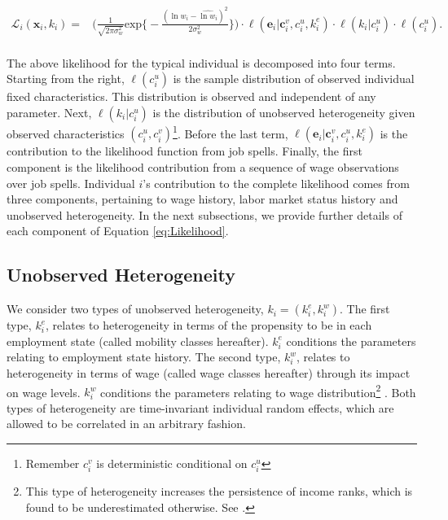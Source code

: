 \documentclass[12pt, a4paper]{article}
\begin{document}

\begin{align}\label{eq:Likelihood}
\mathcal{L}_{i}(\textbf{x}_i,k_i)=& \Bigg( \frac{1}{\sqrt{2\pi \sigma_{w}^{2}}} \text{exp} \Big\{ -\frac{(\ln w_{i} - \widehat{\ln w_{i}})^{2}}{2\sigma_{w}^{2}} \Big\} \Bigg) \cdot \ell(\textbf{e}_i|\textbf{c}_i^v,c_i^u,k_i^e)\cdot \ell(k_i|c_i^u)\cdot \ell (c_i^u).\\ \nonumber
\end{align}


The above likelihood for the typical individual is decomposed into four terms. Starting from the right, $\ell (c_i^u)$ is the sample distribution of observed individual fixed characteristics. This distribution is observed and independent of any parameter. Next, $\ell(k_i|c_i^u)$ is the distribution of unobserved heterogeneity given observed characteristics $(c_i^u,c_i^v)$\footnote{Remember $c_i^v$ is deterministic conditional on $c_i^u$}. Before the last term,  $\ell(\textbf{e}_i|\textbf{c}_{i}^{v},c_{i}^{u},k_{i}^{e})$ is the contribution to the likelihood function from job spells. Finally, the first component is the likelihood contribution from a sequence of wage observations over job spells. Individual $i$'s contribution to the complete likelihood comes from three components, pertaining to wage history, labor market status history and unobserved heterogeneity. In the next subsections, we provide further details of each component of Equation \ref{eq:Likelihood}.

\subsection{Unobserved Heterogeneity}\label{sec:unobs_het}

We consider two types of unobserved heterogeneity, $k_i=(k_i^e,k_i^w)$. The first type, $k_i^e$, relates to heterogeneity in terms of the propensity to be in each employment state (called mobility classes hereafter). $k_i^e$ conditions the parameters relating to employment state history. The second type, $k_i^w$, relates to heterogeneity in terms of wage (called wage classes hereafter) through its impact on wage levels. $k_i^w$ conditions the parameters relating to wage distribution\footnote{This type of heterogeneity increases the persistence of income ranks, which is found to be underestimated otherwise. See \cite{Sh76}.} . Both types of heterogeneity are time-invariant individual random effects, which are allowed to be correlated in an arbitrary fashion.
\end{document}
